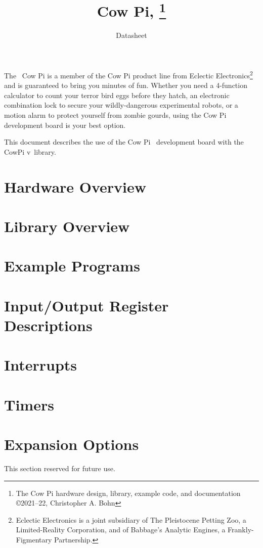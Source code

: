 \documentclass[12pt]{article}
\begin{document}
    \pagestyle{fancy}
    \fancyhf{}
    \cfoot{\thepage}
    \title{Cow Pi, \hardwareversion\footnote{The Cow Pi hardware design, library, example code, and documentation \copyright 2021--22, Christopher A. Bohn}}
    \author{Datasheet}
    \date{}
    \maketitle

    The \hardwareversion\ Cow Pi is a member of the Cow Pi product line from Eclectic Electronics\footnote{
        Eclectic Electronics is a joint subsidiary of The Pleistocene Petting Zoo, a Limited-Reality Corporation, and of Babbage's Analytic Engines, a Frankly-Figmentary Partnership.}
    and is guaranteed to bring you minutes of fun.
    Whether you need a 4-function calculator to count your terror bird eggs before they hatch, an electronic combination lock to secure your wildly-dangerous experimental robots, or a motion alarm to protect yourself from zombie gourds, using the Cow Pi development board is your best option.

    This document describes the use of the Cow Pi \cowpiversion\ development board with the CowPi v\softwareversion\ library.

    \tableofcontents


    \section{Hardware Overview} 

    \section{Library Overview} 

    \section{Example Programs} 

    \section{Input/Output Register Descriptions} \label{sec:IOregisterDescriptions} 

    \section{Interrupts} \label{sec:Interrupts} 

    \section{Timers} \label{sec:Timers} 

    \section{Expansion Options}

    This section reserved for future use.

    
\end{document}
